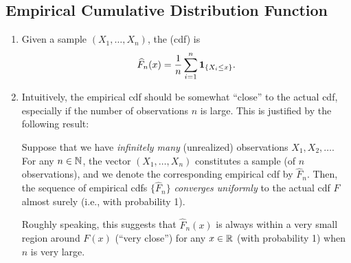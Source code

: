 \subsection{Empirical Cumulative Distribution Function}
\begin{enumerate}
\item Given a sample \((X_1,\dotsc,X_n)\), the  (cdf) is
\[
\widehat{F}_n(x)=\frac{1}{n}\sum_{i=1}^{n}\mathbf{1}_{\left\{X_i\le x\right\}}.
\]

\item Intuitively, the empirical cdf should be somewhat ``close'' to the actual
cdf, especially if the number of observations \(n\) is large. This is justified
by the following result:
\begin{theorem}
\label{thm:gilvenko-cantelli}
Suppose that we have \emph{infinitely many} (unrealized) observations
\(X_1,X_2,\dotsc\).  For any \(n\in\mathbb{N}\), the vector \((X_1,\dotsc,X_n)\)
constitutes a sample (of \(n\) observations), and we denote the corresponding
empirical cdf by \(\widehat{F}_n\). Then, the sequence of empirical cdfs
\(\{\widehat{F}_{n}\}\) \emph{converges uniformly} to the actual cdf \(F\)
almost surely (i.e., with probability 1).
\end{theorem}
\begin{note}
Roughly speaking, this suggests that \(\widehat{F}_{n}(x)\) is always within a
very small region around \(F(x)\) (``very close'') for any \(x\in\mathbb{R}\) (with
probability 1) when \(n\) is very large.
\end{note}
\end{enumerate}
